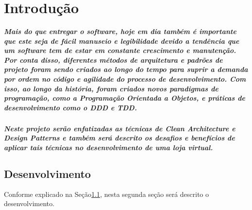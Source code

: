 \chapter{Introdução} \label{cap:introduction}

\paragraph{Mais do que entregar o software, hoje em dia também é importante que este seja de fácil manuseio e legibilidade devido a tendência que um software tem de estar em constante crescimento e manutenção. Por conta disso, diferentes métodos de arquitetura e padrões de projeto foram sendo criados ao longo do tempo para suprir a demanda por ordem no código e agilidade do processo de desenvolvimento.
Com isso, ao longo da história, foram criados novos paradigmas de programação, como a Programação Orientada a Objetos, e práticas de desenvolvimento como o DDD e TDD.}
\paragraph{Neste projeto serão enfatizadas as técnicas de \emph{Clean Architecture} e \emph{Design Patterns} e também será descrito os desafios e benefícios de aplicar tais técnicas no desenvolvimento de uma loja virtual.}

\section{Desenvolvimento}\label{sec:desenv}

Conforme explicado na Seção\ref{sec:desenv}, nesta segunda seção será descrito o desenvolvimento.